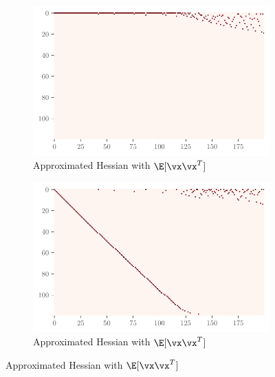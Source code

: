 \begin{figure}[ht]
\begin{subfigure}[t]{0.065\textwidth}
    \end{subfigure}
    \bigskip
\begin{subfigure}[t]{0.46\textwidth}
        \centering
        \captionsetup{justification=centering}
        \includegraphics[width=\textwidth]{Figures/Correspondence/LeNet5_fixlr0.01/xxT_Approxest_real_corr_expand_t200_CIFAR10_Exp1_LeNet5_fixlr0.01R2_E-1_fc1.pdf}
        \caption{Approximated Hessian with $\E[\vx\vx^T]$}
        \label{fig:Corr_xxT_Approx_fc}
    \end{subfigure}%
    \begin{subfigure}[t]{0.46\textwidth}
        \centering
        \captionsetup{justification=centering}
        \includegraphics[width=\textwidth]{Figures/Correspondence/LeNet5_fixlr0.01/UTAU_Approxest_real_corr_expand_t200_CIFAR10_Exp1_LeNet5_fixlr0.01R2_E-1_fc1.pdf}
        \caption{Approximated Hessian with $\E[\vx\vx^T]$}
        \label{fig:Corr_UTAU_Approx_fc}
    \end{subfigure}%

\end{figure}
